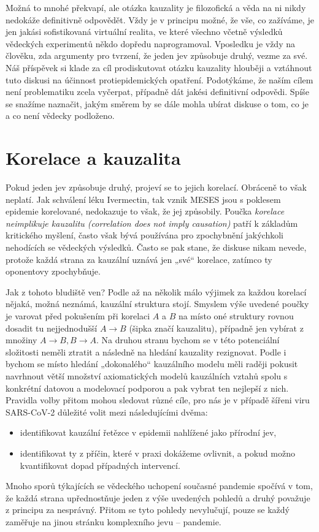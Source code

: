 Možná to mnohé překvapí, ale otázka kauzality je filozofická a věda na ni nikdy nedokáže definitivně odpovědět. Vždy je
v principu možné, že vše, co zažíváme, je jen jakási sofistikovaná
virtuální realita, ve které všechno včetně výsledků vědeckých experimentů
někdo dopředu naprogramoval. Vposledku je vždy na člověku, zda argumenty
pro tvrzení, že jeden jev způsobuje druhý, vezme za své. Náš příspěvek
si klade za cíl prodiskutovat otázku kauzality hlouběji a vztáhnout
tuto diskusi na účinnost
protiepidemických opatření. Podotýkáme, že naším cílem není problematiku
zcela vyčerpat, případně dát jakési definitivní odpovědi. Spíše se snažíme
naznačit, jakým směrem by se dále mohla ubírat diskuse o tom, co je
a co není vědecky podloženo.

\section*{Korelace a kauzalita}

Pokud jeden jev způsobuje druhý, projeví se to jejich korelací. Obráceně to však neplatí. Jak schválení léku Ivermectin, tak vznik MESES jsou s poklesem epidemie korelované, nedokazuje to však, že jej způsobily. Poučka {\em korelace neimplikuje kauzalitu (correlation does not imply causation)} patří k základům kritického myšlení, často však bývá používána pro zpochybnění jakýchkoli nehodících se vědeckých výsledků. Často se pak stane, že diskuse nikam nevede, protože každá strana za kauzální uznává jen „své“ korelace, zatímco ty oponentovy zpochybňuje.

Jak z tohoto bludiště ven? Podle \cite{shipley_2000} až na několik málo výjimek za každou korelací nějaká, možná neznámá, kauzální struktura stojí. Smyslem výše uvedené poučky je varovat před pokušením při korelaci $A$ a $B$ na místo oné struktury rovnou dosadit tu nejjednodušší $A\rightarrow B$ (šipka značí kauzalitu), případně jen vybírat z množiny $A\rightarrow B, B\rightarrow A$. Na druhou stranu bychom se v této potenciální složitosti neměli ztratit a následně na hledání kauzality rezignovat. Podle \cite{shipley_2000} i \cite{pearl2009causality} bychom se místo hledání „dokonalého“ kauzálního modelu měli raději pokusit navrhnout větší množství axiomatických modelů kauzálních vztahů spolu s konkrétní datovou a modelovací podporou a pak vybrat ten nejlepší z nich. Pravidla volby přitom mohou sledovat různé cíle, pro nás je v případě šířeni viru SARS-CoV-2 důležité volit mezi následujícími dvěma:
\begin{itemize}
\item identifikovat kauzální řetězce v epidemii nahlížené jako přírodní jev,
\item identifikovat ty z příčin, které v praxi dokážeme ovlivnit, a pokud možno kvantifikovat dopad případných intervencí.
\end{itemize}
Mnoho sporů týkajících se vědeckého uchopení současné pandemie spočívá v tom, že každá strana upřednostňuje jeden z výše uvedených pohledů a druhý považuje z principu za nesprávný. Přitom se tyto pohledy nevylučují, pouze se každý zaměřuje na jinou stránku komplexního jevu -- pandemie. 

